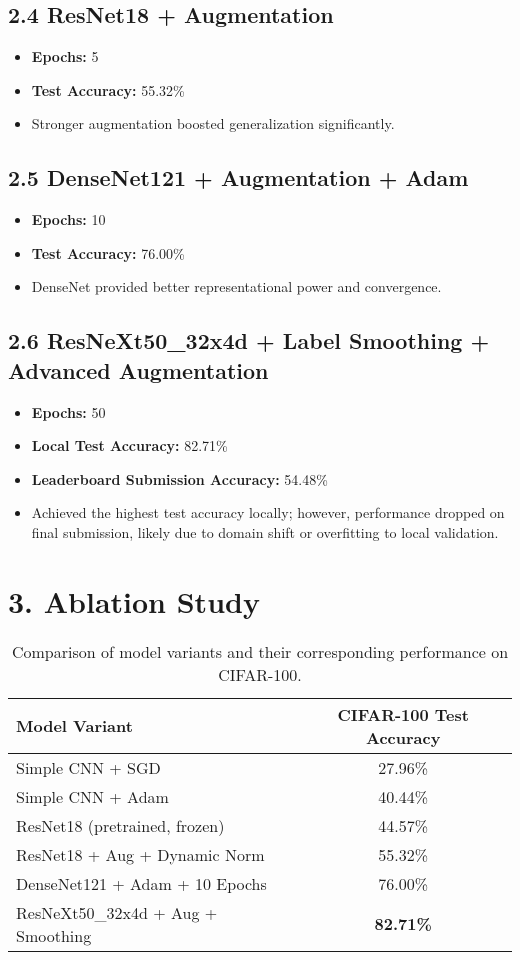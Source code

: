 \documentclass{article}
\begin{document}
\subsection*{2.4 ResNet18 + Augmentation}
\begin{itemize}
    \item \textbf{Epochs:} 5
    \item \textbf{Test Accuracy:} 55.32\%
    \item Stronger augmentation boosted generalization significantly.
\end{itemize}

\subsection*{2.5 DenseNet121 + Augmentation + Adam}
\begin{itemize}
    \item \textbf{Epochs:} 10
    \item \textbf{Test Accuracy:} 76.00\%
    \item DenseNet provided better representational power and convergence.
\end{itemize}

\subsection*{2.6 ResNeXt50\_32x4d + Label Smoothing + Advanced Augmentation}
\begin{itemize}
    \item \textbf{Epochs:} 50
    \item \textbf{Local Test Accuracy:} 82.71\%
    \item \textbf{Leaderboard Submission Accuracy:} 54.48\%
    \item Achieved the highest test accuracy locally; however, performance dropped on final submission, likely due to domain shift or overfitting to local validation.
\end{itemize}

\section*{3. Ablation Study}

\begin{table}[H]
\centering
\begin{tabular}{@{}|l|c|@{}}
\hline
\textbf{Model Variant} & \textbf{CIFAR-100 Test Accuracy} \\
\hline
Simple CNN + SGD & 27.96\% \\
Simple CNN + Adam & 40.44\% \\
ResNet18 (pretrained, frozen) & 44.57\% \\
ResNet18 + Aug + Dynamic Norm & 55.32\% \\
DenseNet121 + Adam + 10 Epochs & 76.00\% \\
ResNeXt50\_32x4d + Aug + Smoothing & \textbf{82.71\%} \\
\hline
\end{tabular}
\caption{Comparison of model variants and their corresponding performance on CIFAR-100.}
\end{table}
\end{document}
